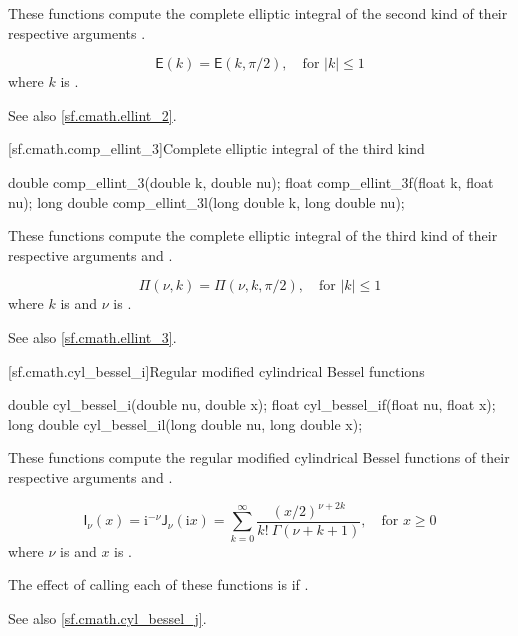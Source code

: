 \begin{itemdescr}

\pnum\effects
These functions compute
the complete elliptic integral of the second kind
of their respective arguments
.

\pnum\returns
\[%
  \mathsf{E}(k) =
  \mathsf{E}(k, \pi / 2),
\quad \mbox{for $|k| \le 1$}
\]
where
$k$ is .

\pnum See also \ref{sf.cmath.ellint_2}.
\end{itemdescr}

[sf.cmath.comp_ellint_3]{Complete elliptic integral of the third kind}%
%
%
%
%
%
\begin{itemdecl}
double       comp_ellint_3(double k, double nu);
float        comp_ellint_3f(float k, float nu);
long double  comp_ellint_3l(long double k, long double nu);
\end{itemdecl}

\begin{itemdescr}

\pnum\effects
These functions compute
the complete elliptic integral of the third kind
of their respective arguments
 and .

\pnum\returns
\[%
  \mathsf{\Pi}(\nu, k) = \mathsf{\Pi}(\nu, k, \pi / 2),
		\quad \mbox{for $|k| \le 1$}
\]
where
$k$ is  and
$\nu$ is .

\pnum See also \ref{sf.cmath.ellint_3}.
\end{itemdescr}

[sf.cmath.cyl_bessel_i]{Regular modified cylindrical Bessel functions}%
%
%
%
%
%
\begin{itemdecl}
double       cyl_bessel_i(double nu, double x);
float        cyl_bessel_if(float nu, float x);
long double  cyl_bessel_il(long double nu, long double x);
\end{itemdecl}

\begin{itemdescr}

\pnum\effects
These functions compute
the regular modified cylindrical Bessel functions
of their respective arguments
 and .

\pnum\returns
\[%
  \mathsf{I}_\nu(x) =
  \mathrm{i}^{-\nu} \mathsf{J}_\nu(\mathrm{i}x)
  =
  \sum_{k=0}^\infty \frac{(x/2)^{\nu+2k}}
			 {k! \: \Gamma(\nu+k+1)},
	   \quad \mbox{for $x \ge 0$}
\]
where
$\nu$ is  and
$x$ is .

\pnum\remarks
The effect of calling each of these functions
is 
if .

\pnum See also \ref{sf.cmath.cyl_bessel_j}.
\end{itemdescr}

